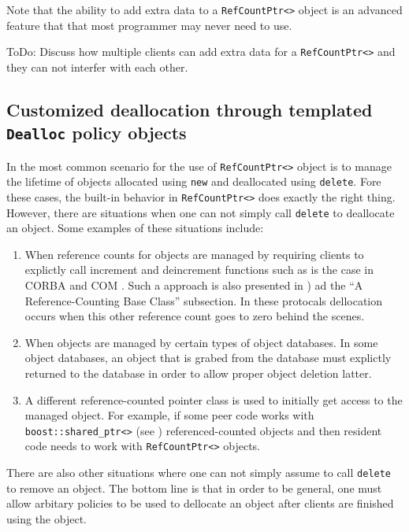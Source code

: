 Note that the ability to add extra data to a {}\texttt{RefCountPtr<>}
object is an advanced feature that that most programmer may never need
to use.

ToDo: Discuss how multiple clients can add extra data for a
{}\texttt{RefCountPtr<>} and they can not interfer with each other.

%
\subsection{Customized deallocation through templated {}\texttt{Dealloc} policy objects}
\label{rcp:sec:dealloc}
%

In the most common scenario for the use of {}\texttt{RefCountPtr<>}
object is to manage the lifetime of objects allocated using
{}\texttt{new} and deallocated using {}\texttt{delete}.  Fore these
cases, the built-in behavior in {}\texttt{RefCountPtr<>} does exactly
the right thing.  However, there are situations when one can not
simply call {}\texttt{delete} to deallocate an object.  Some examples
of these situations include:
%
\begin{enumerate}
\item
When reference counts for objects are managed by requiring clients to
explictly call increment and deincrement functions such as is the case
in CORBA {}\cite{ref:corba} and COM {}\cite{ref:com}.  Such a approach
is also presented in {}\cite[Item 29]{ref:meyers_1996}) ad the ``A
Reference-Counting Base Class'' subsection.  In these protocals
dellocation occurs when this other reference count goes to zero behind
the scenes.
\item
When objects are managed by certain types of object databases.  In
some object databases, an object that is grabed from the database must
explictly returned to the database in order to allow proper object
deletion latter.
\item
A different reference-counted pointer class is used to initially get
access to the managed object.  For example, if some peer code works
with {}\texttt{boost::shared\_ptr<>} (see {}\cite{ref:boost})
referenced-counted objects and then resident code needs to work with
{}\texttt{RefCountPtr<>} objects.
\end{enumerate}
%
There are also other situations where one can not simply assume to call
{}\texttt{delete} to remove an object.  The bottom line is that in order
to be general, one must allow arbitary policies to be used to
dellocate an object after clients are finished using the object.


